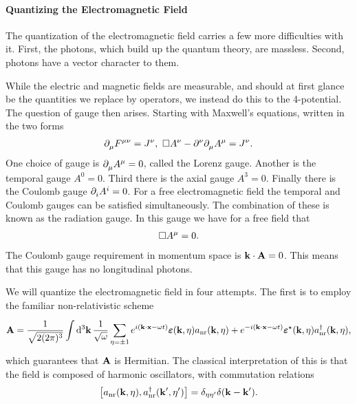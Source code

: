 \paragraph{Quantizing the Electromagnetic Field}
The quantization of the electromagnetic field carries a few more difficulties with it. First, the photons, which build up the quantum theory, are massless. Second, photons have a vector character to them.

While the electric and magnetic fields are measurable, and should at first glance be the quantities we replace by operators, we instead do this to the 4-potential. The question of gauge then arises. Starting with Maxwell's equations, written in the two forms
\begin{align*}
	\partial^{}_{\mu}{F^{\mu\nu}} = J^{\nu},\ \square A^{\nu} - \partial^{\nu}_{}{\partial^{}_{\mu}{A^{\mu}}} = J^{\nu}.
\end{align*}
One choice of gauge is $\partial^{}_{\mu}{A^{\mu}} = 0$, called the Lorenz gauge. Another is the temporal gauge $A^{0} = 0$. Third there is the axial gauge $A^{3} = 0$. Finally there is the Coulomb gauge $\partial^{}_{i}{A^{i}} = 0$. For a free electromagnetic field the temporal and Coulomb gauges can be satisfied simultaneously. The combination of these is known as the radiation gauge. In this gauge we have for a free field that
\begin{align*}
	\square A^{\mu} = 0.
\end{align*}
The Coulomb gauge requirement in momentum space is $\vb{k}\cdot\vb{A} = 0$. This means that this gauge has no longitudinal photons.

We will quantize the electromagnetic field in four attempts. The first is to employ the familiar non-relativistic scheme
\begin{align*}
	\vb{A} = \frac{1}{\sqrt{2(2\pi)^{3}}}\int\limits_{}^{}\dd[3]{\vb{k}}\frac{1}{\sqrt{\omega}}\sum\limits_{\eta = \pm 1}e^{i(\vb{k}\cdot\vb{x} - \omega t)}\vb*{\varepsilon}(\vb{k}, \eta)a_{\text{nr}}(\vb{k}, \eta) + e^{-i(\vb{k}\cdot\vb{x} - \omega t)}\vb*{\varepsilon}^{\star}(\vb{k}, \eta)a_{\text{nr}}^{\dagger}(\vb{k}, \eta),
\end{align*}
which guarantees that $\vb{A}$ is Hermitian. The classical interpretation of this is that the field is composed of harmonic oscillators, with commutation relations
\begin{align*}
	\comm{a_{\text{nr}}(\vb{k}, \eta)}{a_{\text{nr}}\adj(\vb{k}\p, \eta\p)} = \delta_{\eta\eta\p}\delta(\vb{k} - \vb{k}\p).
\end{align*}

